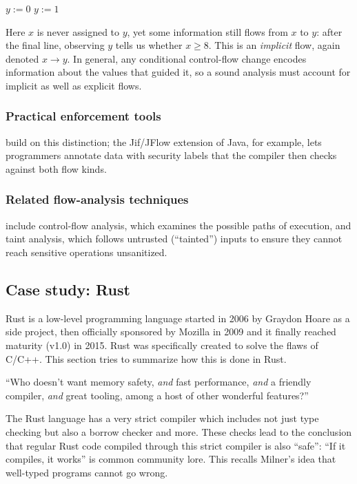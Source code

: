 \documentclass[conference]{IEEEtran}
\begin{document}
\begin{algorithmic}
\STATE $y := 0$
    \STATE $y := 1$
\ENDIF
\end{algorithmic}

Here $x$ is never assigned to $y$, yet some information still flows from $x$ to $y$: after the final line, observing $y$ tells us whether $x \geq 8$. This is an \emph{implicit} flow, again denoted $x \rightarrow y$. In general, any conditional control-flow change encodes information about the values that guided it, so a sound analysis must account for implicit as well as explicit flows. \cite{denning1977infoflow, sabelfeld2003infoflow}

\subsubsection{\textbf{Practical enforcement tools}} build on this distinction; the Jif/JFlow extension of Java, for example, lets programmers annotate data with security labels that the compiler then checks against both flow kinds. \cite{myers1999jflow}

\subsubsection{\textbf{Related flow-analysis techniques}} include control-flow analysis, which examines the possible paths of execution, and taint analysis, which follows untrusted (``tainted'') inputs to ensure they cannot reach sensitive operations unsanitized.

\subsection{Case study: Rust}

Rust is a low-level programming language started in 2006 by Graydon Hoare as a side project, then officially sponsored by Mozilla in 2009 and it finally reached maturity (v1.0) in 2015. Rust was specifically created to solve the flaws of C/C++. \cite{thompson2023rust, hoare2025rustdecade} This section tries to summarize how this is done in Rust.

``Who doesn't want memory safety, \emph{and} fast performance, \emph{and} a friendly compiler, \emph{and} great tooling, among a host of other wonderful features?'' \cite{klabnik2023trpl}

The Rust language has a very strict compiler which includes not just type checking but also a borrow checker and more. \cite{klabnik2023trpl} These checks lead to the conclusion that regular Rust code compiled through this strict compiler is also ``safe'': ``If it compiles, it works'' is common community lore. This recalls Milner's idea that well-typed programs cannot go wrong. \cite{milner1978polymorphism}
\end{document}
